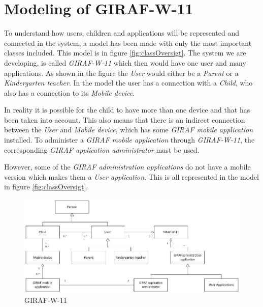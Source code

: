 \section{Modeling of GIRAF-W-11}
To understand how users, children and applications will be represented and connected in the system, a model has been made with only the most important classes included. This model is in figure \vref{fig:classOversigt}. The system we are developing, is called \emph{GIRAF-W-11} which then would have one user and many applications. As shown in the figure the \emph{User} would either be a \emph{Parent} or a \emph{Kindergarten teacher}. In the model the user has a connection with a \emph{Child}, who also has a connection to its \emph{Mobile device}.

In reality it is possible for the child to have more than one device and that has been taken into account. This also means that there is an indirect connection between the \emph{User} and \emph{Mobile device}, which has some \emph{GIRAF mobile application} installed. To administer a \emph{GIRAF mobile application} through \emph{GIRAF-W-11}, the corresponding \emph{GIRAF application administrator} must be used.

However, some of the \emph{GIRAF administration applications} do not have a mobile version which makes them a \emph{User application}. This is all represented in the model in figure \vref{fig:classOversigt}.


\begin{figure}[!ht]
	\centering
		\includegraphics[width=1.00\textwidth]{img/classOversigt.jpg}
	\caption{GIRAF-W-11}
	\label{fig:classOversigt}
\end{figure}
\newpage